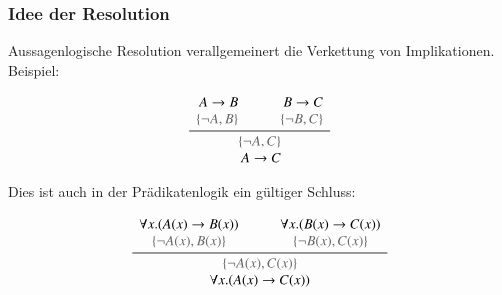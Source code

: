 \documentclass[onlymath]{beamer}
\begin{document}
\begin{frame}\frametitle{Idee der Resolution}

Aussagenlogische Resolution verallgemeinert die Verkettung von Implikationen. Beispiel:\bigskip

\[
\frac{
\begin{array}{r}
A \to B\\
{\color{devilscss}\{\neg A, B\}}
\end{array}
\qquad
\begin{array}{r}
B \to C\\
{\color{devilscss}\{\neg B, C\}}
\end{array}
}{
\begin{array}{r}
{\color{devilscss}\{\neg A, C\}}\\
A \to C
\end{array}
}
\]

\pause Dies ist auch in der Prädikatenlogik ein gültiger Schluss:

\[
\frac{
\begin{array}{c}
\forall x.(A(x) \to B(x))\\
{\color{devilscss}\{\neg A(x), B(x)\}}
\end{array}
\qquad
\begin{array}{c}
\forall x.(B(x) \to C(x))\\
{\color{devilscss}\{\neg B(x), C(x)\}}
\end{array}
}{
\begin{array}{c}
{\color{devilscss}\{\neg A(x), C(x)\}}\\
\forall x.(A(x) \to C(x))
\end{array}
}
\]

\end{frame}
\end{document}
